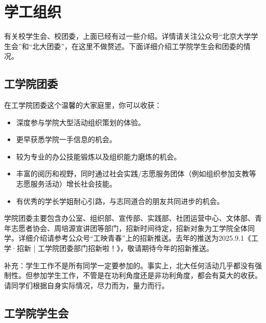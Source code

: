 \section{学工组织}

有关校学生会、校团委，上面已经有过一些介绍。详情请关注公众号“北京大学学生会”和“北大团委”，在这里不做赘述。下面详细介绍工学院学生会和团委的情况。

\vspace{10pt}

\subsection{工学院团委}

在工学院团委这个温馨的大家庭里，你可以收获：

\begin{itemize}
    \item 深度参与学院大型活动组织策划的体验。
    
    \item 更早获悉学院一手信息的机会。
    
    \item 较为专业的办公技能锻炼以及组织能力磨炼的机会。
    
    \item 丰富的阅历和视野，同时通过社会实践/志愿服务团体（例如组织参加支教等志愿服务活动）增长社会技能。
    
    \item 有优秀的学长学姐耐心引路，与志同道合的朋友共同进步的机会。
\end{itemize}

\vspace{10pt}

学院团委主要包含办公室、组织部、宣传部、实践部、社团运营中心、文体部、青年志愿者协会、周培源宣讲团等部门，招新时间待定，招新对象为工学院全体同学。详细介绍请参考公众号“工映青春”上的招新推送。去年的推送为2025.9.1《工学·招新 | 工学院团委部门招新啦！》，敬请期待今年的招新推送。

\vspace{10pt}

补充：学生工作不是所有同学一定要参加的。事实上，北大任何活动几乎都没有强制性。但参加学生工作，不管是在功利角度还是非功利角度，都会有莫大的收获。请同学们根据自身实际情况，尽力而为，量力而行。

\vspace{10pt}


\subsection{工学院学生会}

